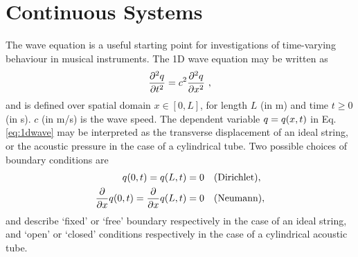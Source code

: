 \section{Continuous Systems}\label{sec:continuous}
%
%
%

The wave equation is a useful starting point for investigations of time-varying behaviour in musical instruments. The 1D wave equation may be written as
\begin{equation}\label{eq:1dwave}
    \frac{\partial^2 q}{\partial t^2}= c^2\frac{\partial^2 q}{\partial x^2}\ ,
\end{equation}
and is defined over spatial domain $x \in [0, L]$, for length $L$ (in m) and time $t \geq 0$ (in s). $c$ (in m/s) is the wave speed. The dependent variable $q = q(x,t)$ in Eq. \eqref{eq:1dwave} may be interpreted as the transverse displacement of an ideal string, or the acoustic pressure in the case of a cylindrical tube. Two possible choices of boundary conditions are
\begin{subequations}\label{eq:continuousBoundaries}
    \begin{align}
        q(0, t) = q(L, t) &= 0\quad \text{(Dirichlet)},\label{eq:contDirichlet}\\
        \frac{\partial}{\partial x} q(0, t) = \frac{\partial}{\partial x} q(L, t) &= 0\quad \text{(Neumann)},\label{eq:contNeumann}
    \end{align}
\end{subequations}
and describe `fixed' or `free' boundary respectively in the case of an ideal string, and `open' or `closed' conditions respectively in the case of a cylindrical acoustic tube.

